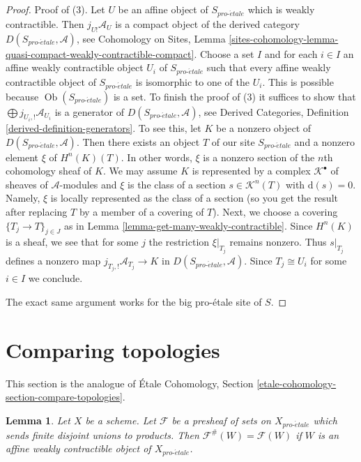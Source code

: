 \documentclass{stacks-project}
\theoremstyle{plain}
\newtheorem{lemma}[subsection]{Lemma}
\theoremstyle{definition}
\theoremstyle{remark}
\numberwithin{equation}{subsection}
\def\Ob{\mathop{\mathrm{Ob}}\nolimits}
\def\proetale{{pro\text{-}\acute{e}tale}}
\begin{document}
\begin{proof}
Proof of (3). Let $U$ be an affine object of $S_\proetale$ which is
weakly contractible. Then $j_{U!}\mathcal{A}_U$ is a compact object
of the derived category $D(S_\proetale, \mathcal{A})$, see
Cohomology on Sites, Lemma
\ref{sites-cohomology-lemma-quasi-compact-weakly-contractible-compact}.
Choose a set $I$ and for each $i \in I$ an affine weakly contractible
object $U_i$ of $S_\proetale$ such that every affine weakly contractible
object of $S_\proetale$ is isomorphic to one of the $U_i$. This is possible
because $\Ob(S_\proetale)$ is a set. To finish the proof of (3) it suffices
to show that $\bigoplus j_{U_i, !}\mathcal{A}_{U_i}$ is a generator
of $D(S_\proetale, \mathcal{A})$, see
Derived Categories, Definition \ref{derived-definition-generators}.
To see this, let $K$ be a nonzero object
of $D(S_\proetale, \mathcal{A})$. Then there exists an object $T$
of our site $S_\proetale$ and a nonzero element $\xi$ of $H^n(K)(T)$.
In other words, $\xi$ is a nonzero section of the $n$th cohomology
sheaf of $K$.
We may assume $K$ is represented by a complex $\mathcal{K}^\bullet$
of sheaves of $\mathcal{A}$-modules and $\xi$ is the class of a
section $s \in \mathcal{K}^n(T)$ with $\text{d}(s) = 0$.
Namely, $\xi$ is locally represented as the class of a section
(so you get the result after replacing $T$ by a member of a covering of $T$).
Next, we choose a covering $\{T_j \to T\}_{j \in J}$
as in Lemma \ref{lemma-get-many-weakly-contractible}.
Since $H^n(K)$ is a sheaf, we see that for some $j$ the restriction
$\xi|_{T_j}$ remains nonzero. Thus $s|_{T_j}$ defines a nonzero map
$j_{T_j, !}\mathcal{A}_{T_j} \to K$ in $D(S_\proetale, \mathcal{A})$.
Since $T_j \cong U_i$ for some $i \in I$ we conclude.

\medskip\noindent
The exact same argument works for the big pro-\'etale site of $S$.
\end{proof}







\section{Comparing topologies}
\label{section-compare-topologies}

\noindent
This section is the analogue of
\'Etale Cohomology, Section \ref{etale-cohomology-section-compare-topologies}.

\begin{lemma}
\label{lemma-presheaf-value-weakly-contractible}
Let $X$ be a scheme. Let $\mathcal{F}$ be a presheaf of sets on $X_\proetale$
which sends finite disjoint unions to products. Then
$\mathcal{F}^\#(W) = \mathcal{F}(W)$ if $W$ is an affine weakly contractible
object of $X_\proetale$.
\end{lemma}
\end{document}
